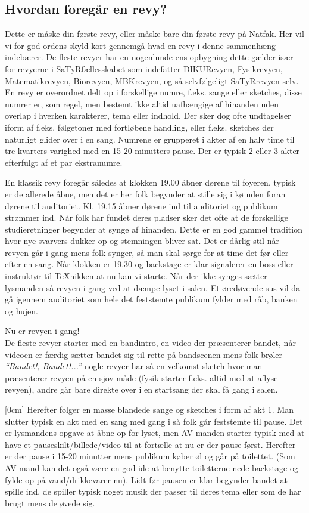 \documentclass[10pt,a4paper,danish]{article}
\let\oldmarginnote\marginnote
\renewcommand{\marginnote}[1]{\oldmarginnote{\raggedright{}\footnotesize #1}}
\begin{document}
\subsection{Hvordan foregår en revy?}
Dette er måske din første revy, eller måske bare din første revy på Natfak.
Her vil vi for god ordens skyld kort gennemgå hvad en revy i denne sammenhæng
indebærer. De fleste revyer har en nogenlunde ens opbygning dette gælder især
for revyerne i SaTyRfællesskabet som indefatter DIKURevyen, Fysikrevyen,
Matematikrevyen, Biorevyen, MBKrevyen, og så selvfølgeligt SaTyRrevyen selv.
En revy er overordnet delt op i forskellige numre, f.eks. sange eller sketches,
disse numrer er, som regel, men bestemt ikke altid uafhængige af hinanden uden
overlap i hverken karakterer, tema eller indhold. Der sker dog ofte undtagelser
iform af f.eks. følgetoner med fortløbene handling, eller f.eks. sketches der
naturligt glider over i en sang. Numrene er grupperet i akter af en halv time
til tre kvarters varighed med en 15-20 minutters pause.
Der er typisk 2 eller 3 akter efterfulgt af et par ekstranumre.

En klassik revy foregår således at klokken 19.00 åbner dørene til foyeren,
typisk er de allerede åbne, men det er her folk begynder at stille sig i kø uden
foran dørene til auditoriet. Kl. 19.15 åbner dørene ind til auditoriet og
publikum strømmer ind. Når folk har fundet deres pladser sker det ofte at de
forskellige studieretninger begynder at synge af hinanden. Dette er en god
gammel tradition hvor nye svarvers dukker op og stemningen bliver sat. Det er
dårlig stil når revyen går i gang mens folk synger, så man skal sørge for at
time det før eller efter en sang. Når klokken er 19.30 og backstage er klar
signalerer en boss eller instruktør til \TeX{}nikken at nu kan vi starte.
Når der ikke synges sætter lysmanden så revyen i gang ved at dæmpe lyset i
salen.
Et øredøvende sus vil da gå igennem auditoriet som hele det feststemte publikum
fylder med råb, banken og hujen.

Nu er revyen i gang!\\


De fleste revyer starter med en bandintro, en video der præsenterer bandet, når
videoen er færdig sætter bandet sig til rette på bandscenen mens folk brøler
\textit{``Bandet!, Bandet!...''} nogle revyer har så en velkomst sketch hvor man
præsenterer revyen på en sjov måde (fysik starter f.eks. altid med at aflyse
revyen), andre går bare direkte over i en startsang der skal få gang i salen.

\marginnote{Nogle revyer foretrækker at holde 20 minutters pause, men skrive 15}[0cm]
Herefter følger en masse blandede sange og sketches i form af akt 1.
Man slutter typisk en akt med en sang med gang i så folk går feststemte til
pause.
Det er lysmandens opgave at åbne op for lyset, men AV manden starter typisk med
at have et pauseskilt/billede/video til at fortælle at nu er der pause først.
Herefter er der pause i 15-20 minutter mens publikum køber øl og går på
toilettet.
(Som AV-mand kan det også være en god ide at benytte toiletterne nede backstage
og fylde op på vand/drikkevarer nu).
Lidt før pausen er klar begynder bandet at spille ind, de spiller typisk noget
musik der passer til deres tema eller som de har brugt mens de øvede sig.
\end{document}
